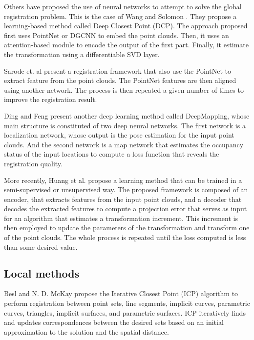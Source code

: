         Others have proposed the use of neural networks to attempt to solve the global registration problem.
        This is the case of Wang and Solomon \cite{Wang_2019_deepclosest}. They propose a learning-based method called Deep Closest Point (DCP).
        The approach proposed first uses PointNet \cite{Qi_2017_pointnetdeep} or DGCNN \cite{Wang_2019_dynamic} to embed the point clouds.
        Then, it uses an attention-based module to encode the output of the first part.
        Finally, it estimate the transformation using a differentiable SVD layer.

        Sarode et. al \cite{Sarode_2019_oneframework} present a registration framework that also use the PointNet to extract feature from the point clouds.
        The PointNet features are then aligned using another network. The process is then repeated a given number of times to improve the registration result.
        
        Ding and Feng \cite{Ding_2019_deepmapping} present another deep learning method called DeepMapping,
        whose main structure is constituted of two deep neural networks.
        The first network is a localization network, whose output is the pose estimation for the input point clouds.
        And the second network is a map network that estimates the occupancy status of the input locations to compute a loss function that reveals
        the registration quality.

        More recently, Huang et al. \cite{Huang_2020_feature} propose a learning method that can be trained in a semi-supervised or unsupervised way.
        The proposed framework is composed of an encoder, that extracts features from the input point clouds, 
        and a decoder that decodes the extracted features to compute a projection error that serves as input for an algorithm that estimates
        a transformation increment. 
        This increment is then employed to update the parameters of the transformation and transform one of the point clouds.
        The whole process is repeated until the loss computed is less than some desired value.
    


        \subsection{Local methods}

        Besl and N. D. McKay \cite{Besl_1992_amethod} propose the Iterative Closest Point (ICP) algorithm to perform registration 
        between point sets, line segments, implicit curves, parametric curves, triangles, implicit surfaces, and parametric surfaces.
        ICP iteratively finds and updates correspondences between the desired sets based on an initial approximation to the solution and 
        the spatial distance.

